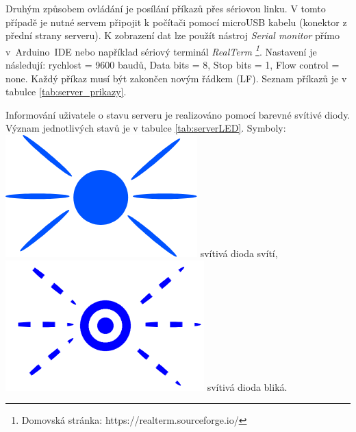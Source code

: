 Druhým způsobem ovládání je posílání příkazů přes sériovou linku. V tomto případě je nutné servem připojit k počítači pomocí microUSB kabelu (konektor z přední strany serveru). K zobrazení dat lze použít nástroj \textit{Serial monitor} přímo v~Arduino~IDE nebo například sériový terminál \textit{RealTerm \footnote{Domovská stránka: https://realterm.sourceforge.io/}}. Nastavení je následují: rychlost = 9600 baudů, Data bits = 8, Stop bits = 1, Flow control = none.  Každý příkaz musí být zakončen novým řádkem (LF). Seznam příkazů je v tabulce \ref{tab:server_prikazy}.

Informování uživatele o stavu serveru je realizováno pomocí barevné svítivé diody. Význam jednotlivých stavů je v tabulce \ref{tab:serverLED}. Symboly: \includegraphics[height=.4cm]{img/manual/blue.png} svítivá dioda svítí, \includegraphics[height=.4cm]{img/manual/blue_blink.png} svítivá dioda bliká.




